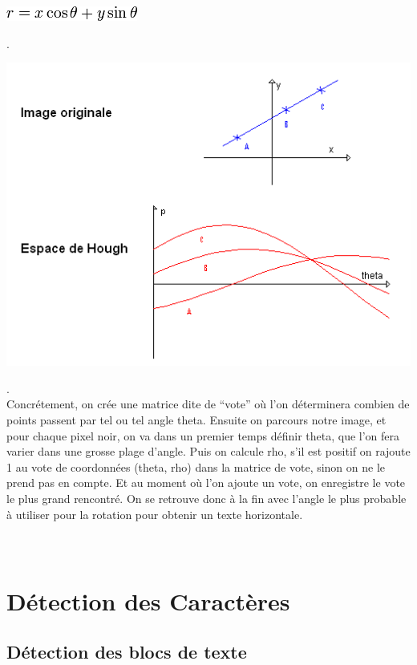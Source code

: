 \documentclass [french,12pt]{article}
\begin{document}
\begin{center} \includegraphics[scale=0.8]{r.png} \end{center}.
\\
\begin{center} \includegraphics[scale=0.7]{Hough_sample2.png} \end{center}.
\\

Concrétement, on crée une matrice dite de “vote” où l’on déterminera combien de points passent par tel ou tel angle theta. Ensuite on parcours notre image, et pour chaque pixel noir, on va dans un premier temps définir theta, que l’on fera varier dans une grosse plage d’angle. Puis on calcule rho, s’il est positif on rajoute 1 au vote de coordonnées (theta, rho) dans la matrice de vote, sinon on ne le prend pas en compte. Et au moment où l’on ajoute un vote, on enregistre le vote le plus grand rencontré. On se retrouve donc à la fin avec l’angle le plus probable à  utiliser pour la rotation pour obtenir un texte horizontale.
\\
\\
\\
\section{Détection des Caractères}
\subsection{Détection des blocs de texte}
\end{document}
